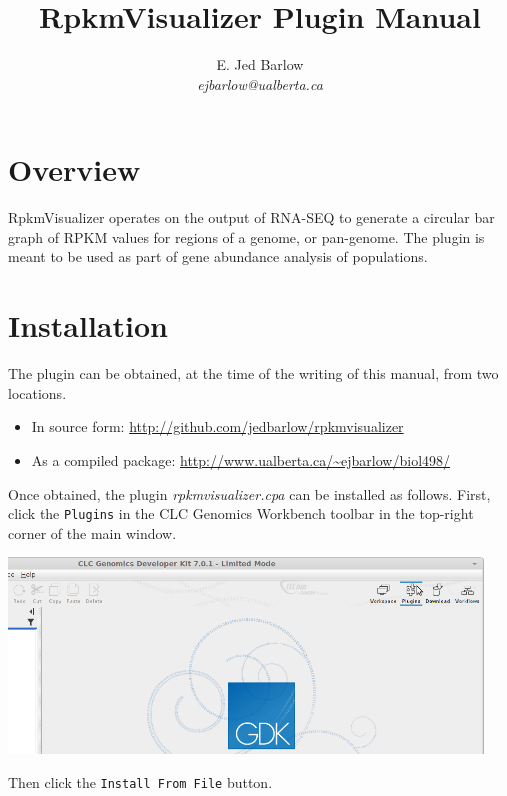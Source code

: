\documentclass[12pt,letterpaper]{article}
\author{
    E. Jed Barlow\\
    \textit{ejbarlow@ualberta.ca}
}
\title{RpkmVisualizer Plugin Manual}
\begin{document}
\maketitle

\hfill

\tableofcontents

\newpage
\section{Overview}
RpkmVisualizer operates on the output of RNA-SEQ to generate a circular bar
graph of RPKM values for regions of a genome, or pan-genome.  The plugin is
meant to be used as part of gene abundance analysis of populations.

\section{Installation}
The plugin can be obtained, at the time of the writing of this manual, from two
locations.

\begin{itemize}
\item
    In source form: \url{http://github.com/jedbarlow/rpkmvisualizer}
\item
    As a compiled package: \url{http://www.ualberta.ca/~ejbarlow/biol498/}
\end{itemize}

Once obtained, the plugin \textit{rpkmvisualizer.cpa} can be installed as
follows.  First, click the \texttt{Plugins} in the CLC Genomics Workbench
toolbar in the top-right corner of the main window.

\begin{center}
    \includegraphics[width=34em]{plugins-button.png}
\end{center}

Then click the \texttt{Install From File} button.
\end{document}
